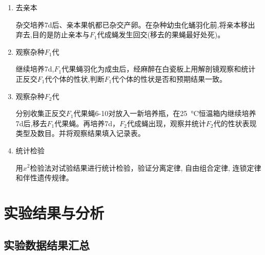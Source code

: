 \documentclass[AutoFakeBold]{LZUThesis}
\begin{document}
\begin{enumerate}
    \item 去亲本\par
    \hspace{2em}杂交培养7d后、亲本果帆都已杂交产卵。在杂种幼虫化蛹羽化前,将亲本移出弃去,目的是防止亲本与$F_1$代成蝇发生回交(移去的果蝇最好处死)。
    \item 观察杂种$F_1$代\par
    \hspace{2em}继续培养7d,$F_1$代果蝇羽化为成虫后，经麻醉在白瓷板上用解剖镜观察和统计正反交$F_1$代个体的性状,判断$F_1$代个体的性状是否和预期结果一致。
    \item 观察杂种$F_2$代\par
    \hspace{2em}分别收集正反交$F_1$代果蝇6-10对放入一新培养瓶，在\SI{25}{\degreeCelsius}恒温箱内继续培养7d后,移去$F_1$代果蝇。再培养7d，$F_2$代成蝇出现，观察并统计$F_2$代的性状表现类型及数目。并将观察结果填入记录表。
    \item 统计检验\par
    \hspace{2em}用$x^2$检验法对试验结果进行统计检验，验证分离定律, 自由组合定律, 连锁定律和伴性遗传规律。
\end{enumerate}

\chapter{实验结果与分析}
\section{实验数据结果汇总}
\end{document}

